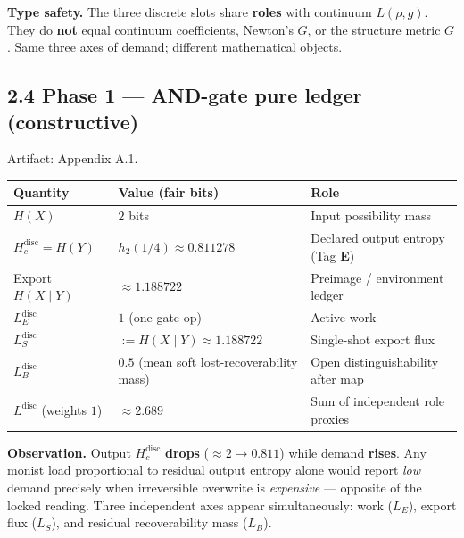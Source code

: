 \documentclass[
  11pt,
]{article}
\newcounter{none} %
\begin{document}
\textbf{Type safety.} The three discrete slots share \textbf{roles} with
continuum \(L(\rho,g)\). They do \textbf{not} equal continuum
coefficients, Newton's \(G\), or the structure metric \(G\). Same three
axes of demand; different mathematical objects.

\subsection{2.4 Phase 1 --- AND-gate pure ledger
(constructive)}\label{phase-1-and-gate-pure-ledger-constructive}

Artifact: Appendix A.1.

{\def\LTcaptype{none} %
\begin{longtable}[]{@{}
  >{\raggedright\arraybackslash}p{}
  >{\raggedright\arraybackslash}p{}
  >{\raggedright\arraybackslash}p{}@{}}
\toprule\noalign{}
\begin{minipage}[b]{\linewidth}\raggedright
Quantity
\end{minipage} & \begin{minipage}[b]{\linewidth}\raggedright
Value (fair bits)
\end{minipage} & \begin{minipage}[b]{\linewidth}\raggedright
Role
\end{minipage} \\
\midrule\noalign{}
\endhead
\bottomrule\noalign{}
\endlastfoot
\(H(X)\) & \(2\) bits & Input possibility mass \\
\(H_c^{\mathrm{disc}}=H(Y)\) & \(h_2(1/4)\approx 0.811278\) & Declared
output entropy (Tag \textbf{E}) \\
Export \(H(X\mid Y)\) & \(\approx 1.188722\) & Preimage / environment
ledger \\
\(L_E^{\mathrm{disc}}\) & \(1\) (one gate op) & Active work \\
\(L_S^{\mathrm{disc}}\) & \(:=H(X\mid Y)\approx 1.188722\) & Single-shot
export flux \\
\(L_B^{\mathrm{disc}}\) & \(0.5\) (mean soft lost-recoverability mass) &
Open distinguishability after map \\
\(L^{\mathrm{disc}}\) (weights \(1\)) & \(\approx 2.689\) & Sum of
independent role proxies \\
\end{longtable}
}

\textbf{Observation.} Output \(H_c^{\mathrm{disc}}\) \textbf{drops}
(\(\approx 2\to 0.811\)) while demand \textbf{rises}. Any monist load
proportional to residual output entropy alone would report \emph{low}
demand precisely when irreversible overwrite is \emph{expensive} ---
opposite of the locked reading. Three independent axes appear
simultaneously: work (\(L_E\)), export flux (\(L_S\)), and residual
recoverability mass (\(L_B\)).
\end{document}
